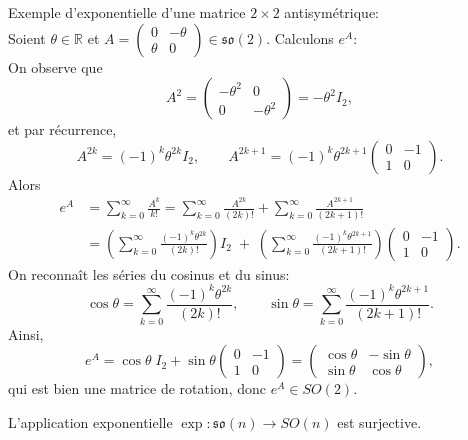 \documentclass[12pt]{report}
\begin{document}
\begin{exemple}
Exemple d'exponentielle d'une matrice $2\times 2$ antisymétrique:\\
Soient $\theta\in\mathbb{R}$ et $A=\begin{pmatrix}0 & -\theta\\\theta & 0\end{pmatrix}\in\mathfrak{so}(2)$. Calculons $e^{A}$:\\
On observe que
\[
A^{2}=\begin{pmatrix} -\theta^{2} & 0 \\ 0 & -\theta^{2} \end{pmatrix} = -\theta^{2} I_{2},
\]
et par récurrence,
\[
A^{2k}={(-1)}^{k}\theta^{2k} I_{2},\qquad A^{2k+1}={(-1)}^{k}\theta^{2k+1} \begin{pmatrix} 0 & -1 \\ 1 & 0 \end{pmatrix}.
\]
Alors
\[
\begin{aligned}
e^{A} &= \sum_{k=0}^{\infty} \frac{A^{k}}{k!}= \sum_{k=0}^{\infty} \frac{A^{2k}}{(2k)!} + \sum_{k=0}^{\infty} \frac{A^{2k+1}}{(2k+1)!}\\
&= \left( \sum_{k=0}^{\infty} \frac{{(-1)}^{k}\theta^{2k}}{(2k)!} \right) I_{2}\;+\; \left( \sum_{k=0}^{\infty} \frac{{(-1)}^{k}\theta^{2k+1}}{(2k+1)!} \right)\begin{pmatrix} 0 & -1 \\ 1 & 0 \end{pmatrix}.
\end{aligned}
\]
On reconnaît les séries du cosinus et du sinus:
\[
\cos\theta=\sum_{k=0}^{\infty} \frac{{(-1)}^{k}\theta^{2k}}{(2k)!},\qquad\sin\theta=\sum_{k=0}^{\infty} \frac{{(-1)}^{k}\theta^{2k+1}}{(2k+1)!}.
\]
Ainsi,
\[
e^{A}=\cos\theta\;I_{2}+\sin\theta \begin{pmatrix} 0 & -1 \\ 1 & 0 \end{pmatrix}=\begin{pmatrix} \cos\theta & -\sin\theta \\ \sin\theta & \cos\theta \end{pmatrix},
\]
qui est bien une matrice de rotation, donc $e^A\in SO(2)$.
\end{exemple}

\begin{proposition}
L'application exponentielle $\exp \colon \mathfrak{so}(n)\longrightarrow SO(n)$ est surjective.
\end{proposition}
\end{document}
